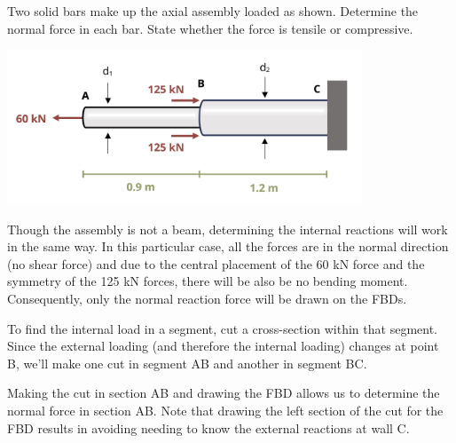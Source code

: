 \documentclass[
  letterpaper,
  DIV=11,
  numbers=noendperiod]{scrreprt}
\theoremstyle{definition}
\theoremstyle{remark}
\begin{document}
\begin{tcolorbox}[enhanced jigsaw, leftrule=.75mm, colbacktitle=quarto-callout-tip-color!10!white, breakable, opacityback=0, colback=white, titlerule=0mm, toprule=.15mm, colframe=quarto-callout-tip-color-frame, coltitle=black, title={Example 1.5}, toptitle=1mm, bottomrule=.15mm, rightrule=.15mm, left=2mm, arc=.35mm, opacitybacktitle=0.6, bottomtitle=1mm]

Two solid bars make up the axial assembly loaded as shown. Determine the
normal force in each bar. State whether the force is tensile or
compressive.

\begin{center}
\includegraphics[width=4.16667in,height=\textheight]{images/CH1 PNGs/example 1.5 part 1.png}
\end{center}

\begin{tcolorbox}[enhanced jigsaw, leftrule=.75mm, colbacktitle=quarto-callout-tip-color!10!white, breakable, opacityback=0, colback=white, titlerule=0mm, toprule=.15mm, colframe=quarto-callout-tip-color-frame, coltitle=black, title={Solution}, toptitle=1mm, bottomrule=.15mm, rightrule=.15mm, left=2mm, arc=.35mm, opacitybacktitle=0.6, bottomtitle=1mm]

Though the assembly is not a beam, determining the internal reactions
will work in the same way. In this particular case, all the forces are
in the normal direction (no shear force) and due to the central
placement of the 60 kN force and the symmetry of the 125 kN forces,
there will be also be no bending moment. Consequently, only the normal
reaction force will be drawn on the FBDs.

To find the internal load in a segment, cut a cross-section within that
segment. Since the external loading (and therefore the internal loading)
changes at point B, we'll make one cut in segment AB and another in
segment BC.

Making the cut in section AB and drawing the FBD allows us to determine
the normal force in section AB. Note that drawing the left section of
the cut for the FBD results in avoiding needing to know the external
reactions at wall C.


\end{tcolorbox}
\end{tcolorbox}
\end{document}
